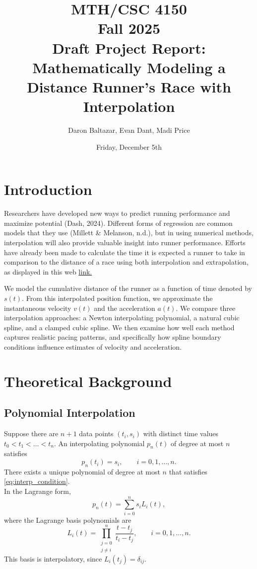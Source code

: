\documentclass[12pt]{article}
\title{MTH/CSC 4150 \\ Fall 2025 \\ Draft Project Report:\\
Mathematically Modeling a Distance Runner's Race with Interpolation}
\author{Daron Baltazar, Evan Dant, Madi Price}
\date{Friday, December 5th}
\begin{document}
\maketitle

\section{Introduction}
Researchers have developed new ways to predict running performance and maximize potential (Dash, 2024). Different forms of regression are common models that they use (Millett \& Melanson, n.d.), but in using numerical methods, interpolation will also provide valuable insight into runner performance. Efforts have already been made to calculate the time it is expected a runner to take in comparison to the distance of a race using both interpolation and extrapolation, as displayed in this web 
\href{https://wismuth.com/running/calculator.html}{link.}

We model the cumulative distance of the runner as a function of time
denoted by $s(t)$. From this interpolated position function, we
approximate the instantaneous velocity $v(t)$ and the acceleration $a(t)$.
We compare three interpolation approaches: a Newton interpolating polynomial, a natural cubic spline, and a clamped cubic spline. We then examine how well each method captures realistic pacing patterns, and specifically how spline boundary conditions influence estimates of velocity and acceleration. 

\section{Theoretical Background}

\subsection{Polynomial Interpolation}
Suppose there are $n+1$ data points $(t_i, s_i)$ with distinct time
values $t_0 < t_1 < \dots < t_n$. An interpolating polynomial
$p_n(t)$ of degree at most $n$ satisfies
\begin{equation}
p_n(t_i) = s_i, \qquad i = 0,1,\dots,n.
\label{eq:interp_condition}
\end{equation}
There exists a unique polynomial of degree at most $n$ that satisfies
\eqref{eq:interp_condition}.
\\

In the Lagrange form,
\begin{equation}
p_n(t) = \sum_{i=0}^{n} s_i L_i(t),
\label{eq:lagrange_poly}
\end{equation}
where the Lagrange basis polynomials are
\begin{equation}
L_i(t) = \prod_{\substack{j=0 \\ j \neq i}}^{n}
\frac{t - t_j}{t_i - t_j}, \qquad i = 0,1,\dots,n.
\label{eq:lagrange_basis}
\end{equation}
This basis is interpolatory, since $L_i(t_j) = \delta_{ij}$.
\\
\end{document}
